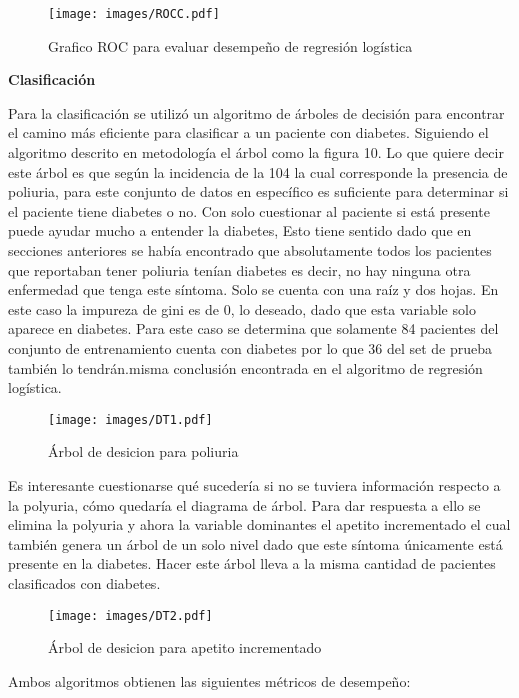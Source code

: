 \documentclass[twocolumn]{bmcart}%
\begin{document}
\begin{itemize}
\begin{figure}[h!]
  \caption{\csentence{}
      Grafico ROC para evaluar desempeño de regresión logística}
\texttt{[image: images/ROCC.pdf]}  
      \end{figure}



\textbf{Clasificación}

Para la clasificación se utilizó un algoritmo de árboles de decisión para encontrar el camino más eficiente para clasificar a un paciente con diabetes. Siguiendo el algoritmo descrito en metodología el árbol como la figura 10. Lo que quiere decir este árbol es que según la incidencia de la 104 la cual corresponde la presencia de poliuria,  para este conjunto de datos en específico es suficiente para determinar si el paciente tiene diabetes o no. Con solo cuestionar al paciente si está presente puede ayudar mucho a entender la diabetes, Esto tiene sentido dado que en secciones anteriores se había encontrado que absolutamente todos los pacientes que reportaban tener poliuria tenían diabetes es decir, no hay ninguna otra enfermedad que tenga este síntoma. Solo se cuenta con una raíz y dos hojas. En este caso la impureza de gini es de 0, lo deseado, dado que esta variable solo aparece en diabetes. Para este caso se determina que solamente 84 pacientes del conjunto de entrenamiento cuenta con diabetes por lo que 36 del set de prueba también lo tendrán.misma conclusión encontrada en el algoritmo de  regresión logística. 

\begin{figure}[h!]
  \caption{\csentence{}
      Árbol de desicion para poliuria}
\texttt{[image: images/DT1.pdf]}  
      \end{figure}


Es interesante cuestionarse qué sucedería si no se tuviera información respecto a la polyuria, cómo quedaría el diagrama de árbol. Para dar respuesta a ello se elimina la polyuria y ahora la variable dominantes el apetito incrementado el cual también genera un árbol de un solo nivel dado que este síntoma únicamente está presente en la diabetes. Hacer este árbol lleva a la misma cantidad de pacientes clasificados con diabetes. 

\begin{figure}[h!]
  \caption{\csentence{}
      Árbol de desicion para apetito incrementado}
\texttt{[image: images/DT2.pdf]}  
      \end{figure}

Ambos algoritmos obtienen las siguientes métricos de desempeño: 


\end{itemize}
\end{document}

